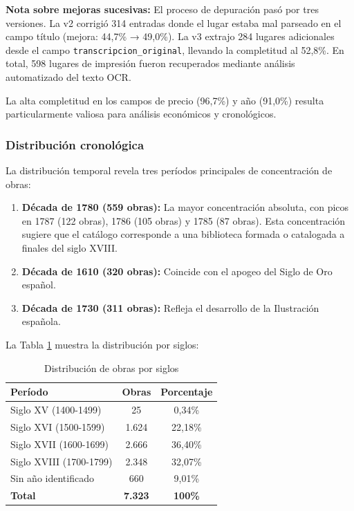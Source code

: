 \documentclass[12pt,a4paper]{article}
\begin{document}
\textbf{Nota sobre mejoras sucesivas:} El proceso de depuración pasó por tres versiones. La v2 corrigió 314 entradas donde el lugar estaba mal parseado en el campo título (mejora: 44,7\% → 49,0\%). La v3 extrajo 284 lugares adicionales desde el campo \texttt{transcripcion\_original}, llevando la completitud al 52,8\%. En total, 598 lugares de impresión fueron recuperados mediante análisis automatizado del texto OCR.

La alta completitud en los campos de precio (96,7\%) y año (91,0\%) resulta particularmente valiosa para análisis económicos y cronológicos.

\subsubsection{Distribución cronológica}

La distribución temporal revela tres períodos principales de concentración de obras:

\begin{enumerate}
    \item \textbf{Década de 1780 (559 obras):} La mayor concentración absoluta, con picos en 1787 (122 obras), 1786 (105 obras) y 1785 (87 obras). Esta concentración sugiere que el catálogo corresponde a una biblioteca formada o catalogada a finales del siglo XVIII.

    \item \textbf{Década de 1610 (320 obras):} Coincide con el apogeo del Siglo de Oro español.

    \item \textbf{Década de 1730 (311 obras):} Refleja el desarrollo de la Ilustración española.
\end{enumerate}

La Tabla \ref{tab:siglos} muestra la distribución por siglos:

\begin{table}[h]
\centering
\caption{Distribución de obras por siglos}
\label{tab:siglos}
\begin{tabular}{lcc}
\toprule
\textbf{Período} & \textbf{Obras} & \textbf{Porcentaje} \\
\midrule
Siglo XV (1400-1499) & 25 & 0,34\% \\
Siglo XVI (1500-1599) & 1.624 & 22,18\% \\
Siglo XVII (1600-1699) & 2.666 & 36,40\% \\
Siglo XVIII (1700-1799) & 2.348 & 32,07\% \\
Sin año identificado & 660 & 9,01\% \\
\midrule
\textbf{Total} & \textbf{7.323} & \textbf{100\%} \\
\bottomrule
\end{tabular}
\end{table}
\end{document}
